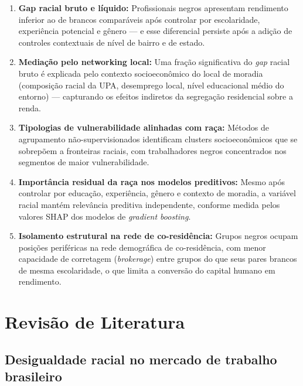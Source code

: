 \documentclass[12pt, a4paper, oneside]{article}
\begin{document}
\begin{enumerate}
  \item[\textbf{H1}] \textbf{Gap racial bruto e líquido:}
    Profissionais negros apresentam rendimento inferior ao de brancos
    comparáveis após controlar por escolaridade, experiência potencial
    e gênero --- e esse diferencial persiste após a adição de controles
    contextuais de nível de bairro e de estado.

  \item[\textbf{H2}] \textbf{Mediação pelo networking local:}
    Uma fração significativa do \textit{gap} racial bruto é explicada
    pelo contexto socioeconômico do local de moradia (composição racial da
    UPA, desemprego local, nível educacional médio do entorno) ---
    capturando os efeitos indiretos da segregação residencial sobre a renda.

  \item[\textbf{H3}] \textbf{Tipologias de vulnerabilidade alinhadas com raça:}
    Métodos de agrupamento não-supervisionados identificam clusters
    socioeconômicos que se sobrepõem a fronteiras raciais, com trabalhadores
    negros concentrados nos segmentos de maior vulnerabilidade.

  \item[\textbf{H4}] \textbf{Importância residual da raça nos modelos preditivos:}
    Mesmo após controlar por educação, experiência, gênero e contexto de
    moradia, a variável racial mantém relevância preditiva independente,
    conforme medida pelos valores SHAP dos modelos de \textit{gradient boosting}.

  \item[\textbf{H5}] \textbf{Isolamento estrutural na rede de co-residência:}
    Grupos negros ocupam posições periféricas na rede demográfica de
    co-residência, com menor capacidade de corretagem (\textit{brokerage})
    entre grupos do que seus pares brancos de mesma escolaridade, o que
    limita a conversão do capital humano em rendimento.
\end{enumerate}

\section{Revisão de Literatura}
\label{sec:revisao}

\subsection{Desigualdade racial no mercado de trabalho brasileiro}
\end{document}
